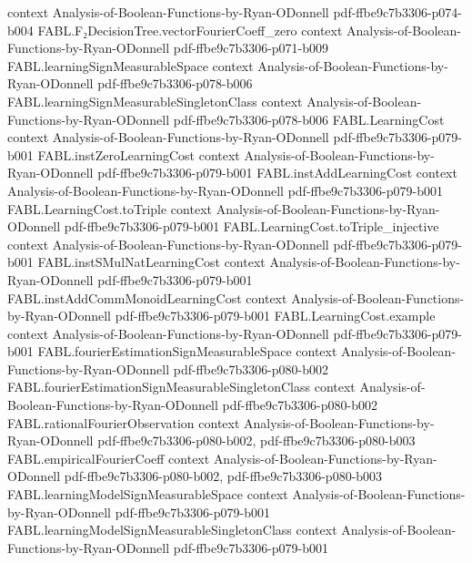 \begin{theorem}
  {context}
  {Analysis-of-Boolean-Functions-by-Ryan-ODonnell}
  {pdf-ffbe9c7b3306-p074-b004}
\proofstep
  {FABL.F₂DecisionTree.vectorFourierCoeff_zero}
  {context}
  {Analysis-of-Boolean-Functions-by-Ryan-ODonnell}
  {pdf-ffbe9c7b3306-p071-b009}
\proofstep
  {FABL.learningSignMeasurableSpace}
  {context}
  {Analysis-of-Boolean-Functions-by-Ryan-ODonnell}
  {pdf-ffbe9c7b3306-p078-b006}
\proofstep
  {FABL.learningSignMeasurableSingletonClass}
  {context}
  {Analysis-of-Boolean-Functions-by-Ryan-ODonnell}
  {pdf-ffbe9c7b3306-p078-b006}
\proofstep
  {FABL.LearningCost}
  {context}
  {Analysis-of-Boolean-Functions-by-Ryan-ODonnell}
  {pdf-ffbe9c7b3306-p079-b001}
\proofstep
  {FABL.instZeroLearningCost}
  {context}
  {Analysis-of-Boolean-Functions-by-Ryan-ODonnell}
  {pdf-ffbe9c7b3306-p079-b001}
\proofstep
  {FABL.instAddLearningCost}
  {context}
  {Analysis-of-Boolean-Functions-by-Ryan-ODonnell}
  {pdf-ffbe9c7b3306-p079-b001}
\proofstep
  {FABL.LearningCost.toTriple}
  {context}
  {Analysis-of-Boolean-Functions-by-Ryan-ODonnell}
  {pdf-ffbe9c7b3306-p079-b001}
\proofstep
  {FABL.LearningCost.toTriple_injective}
  {context}
  {Analysis-of-Boolean-Functions-by-Ryan-ODonnell}
  {pdf-ffbe9c7b3306-p079-b001}
\proofstep
  {FABL.instSMulNatLearningCost}
  {context}
  {Analysis-of-Boolean-Functions-by-Ryan-ODonnell}
  {pdf-ffbe9c7b3306-p079-b001}
\proofstep
  {FABL.instAddCommMonoidLearningCost}
  {context}
  {Analysis-of-Boolean-Functions-by-Ryan-ODonnell}
  {pdf-ffbe9c7b3306-p079-b001}
\proofstep
  {FABL.LearningCost.example}
  {context}
  {Analysis-of-Boolean-Functions-by-Ryan-ODonnell}
  {pdf-ffbe9c7b3306-p079-b001}
\proofstep
  {FABL.fourierEstimationSignMeasurableSpace}
  {context}
  {Analysis-of-Boolean-Functions-by-Ryan-ODonnell}
  {pdf-ffbe9c7b3306-p080-b002}
\proofstep
  {FABL.fourierEstimationSignMeasurableSingletonClass}
  {context}
  {Analysis-of-Boolean-Functions-by-Ryan-ODonnell}
  {pdf-ffbe9c7b3306-p080-b002}
\proofstep
  {FABL.rationalFourierObservation}
  {context}
  {Analysis-of-Boolean-Functions-by-Ryan-ODonnell}
  {pdf-ffbe9c7b3306-p080-b002,
    pdf-ffbe9c7b3306-p080-b003}
\proofstep
  {FABL.empiricalFourierCoeff}
  {context}
  {Analysis-of-Boolean-Functions-by-Ryan-ODonnell}
  {pdf-ffbe9c7b3306-p080-b002,
    pdf-ffbe9c7b3306-p080-b003}
\proofstep
  {FABL.learningModelSignMeasurableSpace}
  {context}
  {Analysis-of-Boolean-Functions-by-Ryan-ODonnell}
  {pdf-ffbe9c7b3306-p079-b001}
\proofstep
  {FABL.learningModelSignMeasurableSingletonClass}
  {context}
  {Analysis-of-Boolean-Functions-by-Ryan-ODonnell}
  {pdf-ffbe9c7b3306-p079-b001}
\proofstep

\end{theorem}
